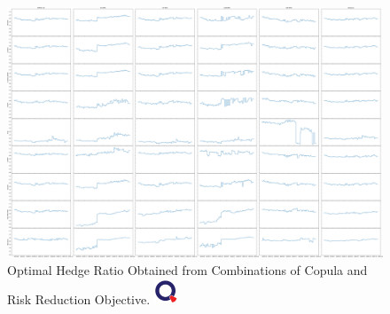 \newpage
\begin{landscape}
\begin{figure}[th]
   \centering
   \includegraphics[width=\linewidth]{_pics/OHRs.png}
   \caption{Optimal Hedge Ratio Obtained from Combinations of Copula and Risk Reduction Objective.
   \href{http://www.quantlet.com/}{\includegraphics[width=20pt]{_pics/qletlogo_tr.png}}}
   \label{fig:OHRs}
\end{figure}
\end{landscape}
\newpage



